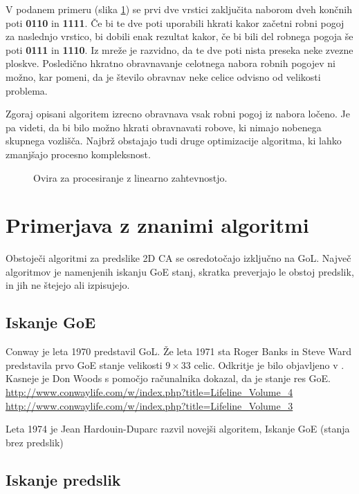 \documentclass[12pt,a4paper,openany,twoside]{book}
\begin{document}
V podanem primeru (slika \ref{algorithm_issue}) se prvi dve vrstici zaključita
naborom dveh končnih poti \textbf{0110} in \textbf{1111}. Če bi te dve poti
uporabili hkrati kakor začetni robni pogoj za naslednjo vrstico, bi dobili
enak rezultat kakor, če bi bili del robnega pogoja še poti \textbf{0111} in \textbf{1110}.
Iz mreže je razvidno, da te dve poti nista preseka neke zvezne ploskve.
Posledično hkratno obravnavanje celotnega nabora robnih pogojev ni možno,
kar pomeni, da je število obravnav neke celice odvisno od velikosti problema.

Zgoraj opisani algoritem izrecno obravnava vsak robni pogoj iz nabora ločeno.
Je pa videti, da bi bilo možno hkrati obravnavati robove, ki nimajo nobenega skupnega
vozlišča. Najbrž obstajajo tudi druge optimizacije algoritma, ki lahko zmanjšajo
procesno kompleksnost.

\begin{figure}[htb]
\centerline{}
\caption[Ovira za procesiranje z linearno zahtevnostjo.]{Ovira za procesiranje z linearno zahtevnostjo.}
\label{algorithm_issue}
\end{figure}

\chapter{Primerjava z znanimi algoritmi}

Obstoječi algoritmi za predslike 2D CA se osredotočajo izključno na GoL.
Največ algoritmov je namenjenih iskanju GoE stanj, skratka preverjajo le
obstoj predslik, in jih ne štejejo ali izpisujejo.

\section{Iskanje GoE}

Conway je leta 1970 predstavil GoL. Že leta 1971 sta Roger Banks in Steve Ward
predstavila prvo GoE stanje velikosti \(9 \times 33\) celic.
Odkritje je bilo objavljeno v \cite{}. Kasneje je Don Woods \cite{} s pomočjo računalnika
dokazal, da je stanje res GoE.
\url{http://www.conwaylife.com/w/index.php?title=Lifeline_Volume_4}
\url{http://www.conwaylife.com/w/index.php?title=Lifeline_Volume_3}

Leta 1974 je Jean Hardouin-Duparc razvil novejši algoritem,
Iskanje GoE (stanja brez predslik) 


\section{Iskanje predslik}
\end{document}

